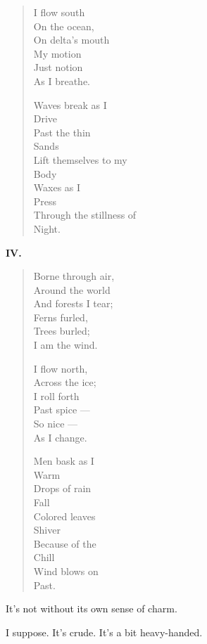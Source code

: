 \begin{paracol}{2}
\begin{leftcolumn}
\begin{verse}
  I flow south\\
  \vin On the ocean,\\
  On delta's mouth\\
  \vin My motion\\
  \vin Just notion\\
  As I breathe.

  Waves break as I\\
  \vin \vin Drive\\
  Past the thin\\
  \vin \vin Sands\\
  Lift themselves to my\\
  \vin \vin Body\\
  Waxes as I\\
  \vin \vin Press\\
  Through the stillness of\\
  \vin \vin Night.
\end{verse}
\newpage

\textbf{IV.}
\begin{verse}
  Borne through air,\\
  \vin Around the world\\
  And forests I tear;\\
  \vin Ferns furled,\\
  \vin Trees burled;\\
  I am the wind.

  I flow north,\\
  \vin Across the ice;\\
  I roll forth\\
  \vin Past spice ---\\
  \vin So nice ---\\
  As I change.

  Men bask as I\\
  \vin \vin Warm\\
  Drops of rain\\
  \vin \vin Fall\\
  Colored leaves\\
  \vin \vin Shiver\\
  Because of the\\
  \vin \vin Chill\\
  Wind blows on\\
  \vin \vin Past.
\end{verse}
\newpage

\begin{ally}
It's not without its own sense of charm.
\end{ally}
I suppose. It's crude. It's a bit heavy-handed.


\end{leftcolumn}
\end{paracol}
